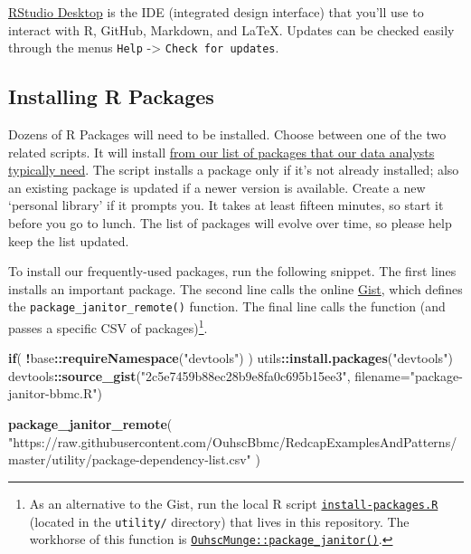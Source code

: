 \documentclass[
]{book}
\newenvironment{Shaded}{\begin{snugshade}}{\end{snugshade}}
\newcommand{\ControlFlowTok}[1]{\textcolor[rgb]{0.13,0.29,0.53}{\textbf{#1}}}
\newcommand{\DataTypeTok}[1]{\textcolor[rgb]{0.13,0.29,0.53}{#1}}
\newcommand{\KeywordTok}[1]{\textcolor[rgb]{0.13,0.29,0.53}{\textbf{#1}}}
\newcommand{\NormalTok}[1]{#1}
\newcommand{\OperatorTok}[1]{\textcolor[rgb]{0.81,0.36,0.00}{\textbf{#1}}}
\newcommand{\StringTok}[1]{\textcolor[rgb]{0.31,0.60,0.02}{#1}}
\begin{document}
\href{http://www.rstudio.com/ide/download/desktop}{RStudio Desktop} is the IDE (integrated design interface) that you'll use to interact with R, GitHub, Markdown, and LaTeX. Updates can be checked easily through the menus \texttt{Help} -\textgreater{} \texttt{Check\ for\ updates}.

\hypertarget{installing-r-packages}{%
\subsection{Installing R Packages}\label{installing-r-packages}}

Dozens of R Packages will need to be installed. Choose between one of the two related scripts. It will install \href{https://github.com/OuhscBbmc/RedcapExamplesAndPatterns/blob/master/utility/package-dependency-list.csv}{from our list of packages that our data analysts typically need}. The script installs a package only if it's not already installed; also an existing package is updated if a newer version is available. Create a new `personal library' if it prompts you. It takes at least fifteen minutes, so start it before you go to lunch. The list of packages will evolve over time, so please help keep the list updated.

To install our frequently-used packages, run the following snippet. The first lines installs an important package. The second line calls the online \href{https://gist.github.com/wibeasley/2c5e7459b88ec28b9e8fa0c695b15ee3}{Gist}, which defines the \texttt{package\_janitor\_remote()} function. The final line calls the function (and passes a specific CSV of packages)\footnote{As an alternative to the Gist, run the local R script \href{https://github.com/OuhscBbmc/RedcapExamplesAndPatterns/blob/master/utility/install-packages.R}{\texttt{install-packages.R}} (located in the \texttt{utility/} directory) that lives in this repository. The workhorse of this function is \href{https://github.com/OuhscBbmc/OuhscMunge/blob/master/R/package-janitor.R}{\texttt{OuhscMunge::package\_janitor()}}.}.

\begin{Shaded}
\begin{Highlighting}[]
\ControlFlowTok{if}\NormalTok{( }\OperatorTok{!}\NormalTok{base}\OperatorTok{::}\KeywordTok{requireNamespace}\NormalTok{(}\StringTok{"devtools"}\NormalTok{) ) utils}\OperatorTok{::}\KeywordTok{install.packages}\NormalTok{(}\StringTok{"devtools"}\NormalTok{)}
\NormalTok{devtools}\OperatorTok{::}\KeywordTok{source\_gist}\NormalTok{(}\StringTok{"2c5e7459b88ec28b9e8fa0c695b15ee3"}\NormalTok{, }\DataTypeTok{filename=}\StringTok{"package{-}janitor{-}bbmc.R"}\NormalTok{)}

\KeywordTok{package\_janitor\_remote}\NormalTok{(}
  \StringTok{"https://raw.githubusercontent.com/OuhscBbmc/RedcapExamplesAndPatterns/master/utility/package{-}dependency{-}list.csv"}
\NormalTok{)}
\end{Highlighting}
\end{Shaded}
\end{document}
